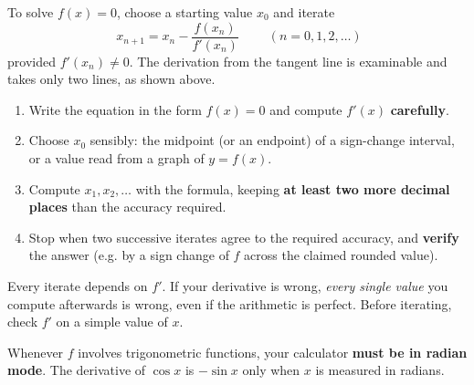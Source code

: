 \documentclass[11pt]{article}
\newcounter{popsec}
\newcounter{popsub}
\newcommand{\courssub}[1]{%
  \stepcounter{popsub}%
  \par\vspace{9pt}\noindent{\popxbold\fontsize{11.5}{13}\selectfont\color{popink}{\color{poporange}\thepopsec.\thepopsub}\hspace{6pt}#1}\par\nopagebreak\vspace{4pt}
}
\begin{document}
\begin{propriete}
To solve $f(x)=0$, choose a starting value $x_0$ and iterate
\[ \boxed{\;x_{n+1} = x_n - \frac{f(x_n)}{f'(x_n)}\;} \qquad (n = 0, 1, 2, \dots) \]
provided $f'(x_n)\neq 0$. The derivation from the tangent line is examinable and takes only two lines, as shown above.
\end{propriete}

\begin{methode}
\begin{enumerate}
\item Write the equation in the form $f(x)=0$ and compute $f'(x)$ \textbf{carefully}.
\item Choose $x_0$ sensibly: the midpoint (or an endpoint) of a sign-change interval, or a value read from a graph of $y=f(x)$.
\item Compute $x_1, x_2, \dots$ with the formula, keeping \textbf{at least two more decimal places} than the accuracy required.
\item Stop when two successive iterates agree to the required accuracy, and \textbf{verify} the answer (e.g. by a sign change of $f$ across the claimed rounded value).
\end{enumerate}
\end{methode}

\begin{attention}
Every iterate depends on $f'$. If your derivative is wrong, \emph{every single value} you compute afterwards is wrong, even if the arithmetic is perfect. Before iterating, check $f'$ on a simple value of $x$.
\end{attention}

\begin{attention}[Radians!]
Whenever $f$ involves trigonometric functions, your calculator \textbf{must be in radian mode}. The derivative of $\cos x$ is $-\sin x$ only when $x$ is measured in radians.
\end{attention}

\courssub{Worked Examples}
\end{document}

